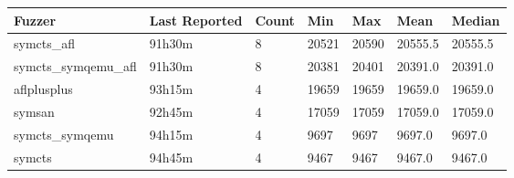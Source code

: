 
\begin{table*}[h]
\centering
\begin{tabular}{|l|l|l|l|l|l|l|}
\hline
\textbf{Fuzzer} & \textbf{Last Reported} & \textbf{Count} & \textbf{Min} & \textbf{Max} & \textbf{Mean} & \textbf{Median} \\
\hline
symcts\_afl        & 91h30m             & 8      & 20521 & 20590 & 20555.5       & 20555.5    \\
symcts\_symqemu\_afl & 91h30m             & 8      & 20381 & 20401 & 20391.0       & 20391.0    \\
aflplusplus        & 93h15m             & 4      & 19659 & 19659 & 19659.0       & 19659.0    \\
symsan             & 92h45m             & 4      & 17059 & 17059 & 17059.0       & 17059.0    \\
symcts\_symqemu    & 94h15m             & 4      & 9697  & 9697  & 9697.0        & 9697.0     \\
symcts             & 94h45m             & 4      & 9467  & 9467  & 9467.0        & 9467.0     \\
\hline
\end{tabular}
\end{table*}